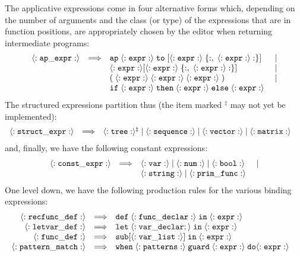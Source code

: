 The {\mys applicative expressions} come in four alternative forms which,
 depending on the number of arguments and the class (or type) of the expressions that are
in function positions, are appropriately chosen by the \pired editor
when returning intermediate programs:
$$
\begin{array}{rclc}
{\tt \langle:ap\_expr:\rangle} & \Longrightarrow &
{\tt ap\;\langle:expr:\rangle\;to\;[\langle:expr:\rangle\;\{:,\;\langle:expr:\rangle:\}]} & |\\
& & {\tt \langle:expr:\rangle[\langle:expr:\rangle\;\{:,\;\langle:expr:\rangle:\}]} & |\\
& & {\tt (\;\langle:expr:\rangle\;\langle:expr:\rangle\;\langle:expr:\rangle\;)} & |\\
& & {\tt if\;\langle:expr:\rangle\;then\;\langle:expr:\rangle\;else\;\langle:expr:\rangle\;} & 
\end{array}
$$
The {\mys structured expressions} partition thus (the item marked $^\ddagger$
 may not yet be implemented):
$$
\begin{array}{rclc}
{\tt \langle:struct\_expr:\rangle} & \Longrightarrow & 
{\tt \langle:tree:\rangle ^\ddagger
\;| \; \langle:sequence:\rangle \; |
\; \langle:vector:\rangle \; |\; \langle:matrix:\rangle} &
\end{array}
$$
and, finally, we have the following {\mys constant expressions}:
$$
\begin{array}{rclc}
{\tt \langle:const\_expr:\rangle} & \Longrightarrow & {\tt \langle:var:\rangle\;|\; \langle:num:\rangle\;|\; \langle:bool:\rangle\;} & |\\
& & {\tt \langle:string:\rangle\;|\; \langle:prim\_func:\rangle\;} &
\end{array}
$$
One level down, we have the following production rules for the various binding expressions:
$$
\begin{array}{rclc}
{\tt \langle:recfunc\_def:\rangle} & \Longrightarrow &
{\tt def\;\langle:func\_declar:\rangle\;in\; \langle:expr:\rangle} &\\
{\tt \langle:letvar\_def:\rangle} & \Longrightarrow &
{\tt let\;\langle:var\_declar;\rangle\;in\; \langle:expr:\rangle} &\\
{\tt \langle:func\_def:\rangle} & \Longrightarrow &
{\tt sub[\langle:var\_list:\rangle]\;in\; \langle:expr:\rangle} &\\
{\tt \langle:pattern\_match:\rangle} & \Longrightarrow &
{\tt when\;\langle:patterns:\rangle\;guard\; \langle:expr:\rangle\;do \langle:expr:\rangle} &
\end{array}
$$

